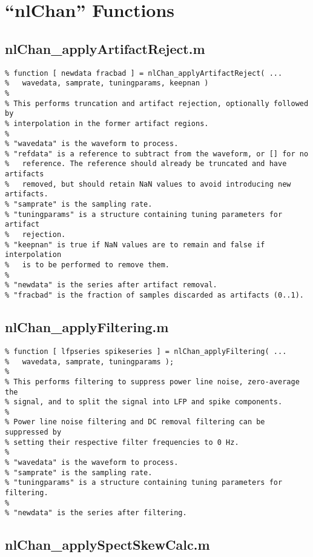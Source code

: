 \chapter{``nlChan'' Functions}
\label{sect-chan}

\section{nlChan\_applyArtifactReject.m}

\begin{verbatim}
% function [ newdata fracbad ] = nlChan_applyArtifactReject( ...
%   wavedata, samprate, tuningparams, keepnan )
%
% This performs truncation and artifact rejection, optionally followed by
% interpolation in the former artifact regions.
%
% "wavedata" is the waveform to process.
% "refdata" is a reference to subtract from the waveform, or [] for no
%   reference. The reference should already be truncated and have artifacts
%   removed, but should retain NaN values to avoid introducing new artifacts.
% "samprate" is the sampling rate.
% "tuningparams" is a structure containing tuning parameters for artifact
%   rejection.
% "keepnan" is true if NaN values are to remain and false if interpolation
%   is to be performed to remove them.
%
% "newdata" is the series after artifact removal.
% "fracbad" is the fraction of samples discarded as artifacts (0..1).
\end{verbatim}

\section{nlChan\_applyFiltering.m}

\begin{verbatim}
% function [ lfpseries spikeseries ] = nlChan_applyFiltering( ...
%   wavedata, samprate, tuningparams );
%
% This performs filtering to suppress power line noise, zero-average the
% signal, and to split the signal into LFP and spike components.
%
% Power line noise filtering and DC removal filtering can be suppressed by
% setting their respective filter frequencies to 0 Hz.
%
% "wavedata" is the waveform to process.
% "samprate" is the sampling rate.
% "tuningparams" is a structure containing tuning parameters for filtering.
%
% "newdata" is the series after filtering.
\end{verbatim}

\section{nlChan\_applySpectSkewCalc.m}

